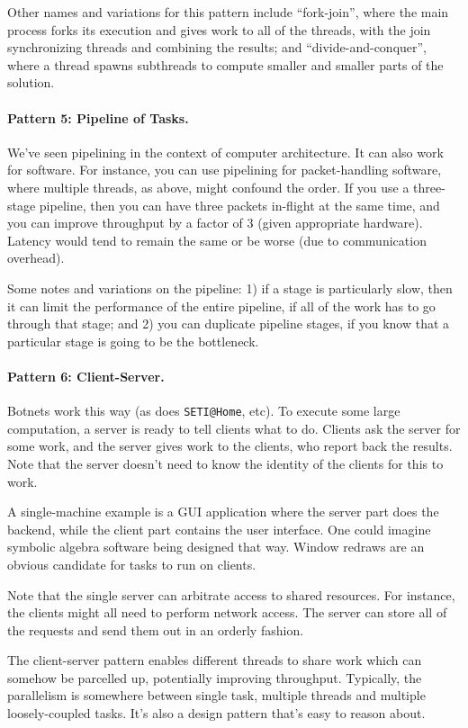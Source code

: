 \documentclass[a4paper]{report}
\begin{document}
Other names and variations for this pattern include ``fork-join'',
where the main process forks its execution and gives work to all of
the threads, with the join synchronizing threads and combining the
results; and ``divide-and-conquer'', where a thread spawns subthreads
to compute smaller and smaller parts of the solution.

\paragraph{Pattern 5: Pipeline of Tasks.} We've seen pipelining in the context of
computer architecture. It can also work for software. For instance,
you can use pipelining for packet-handling software, where multiple
threads, as above, might confound the order. If you use a three-stage
pipeline, then you can have three packets in-flight at the same time,
and you can improve throughput by a factor of 3 (given appropriate
hardware).  Latency would tend to remain the same or be worse (due to
communication overhead).

Some notes and variations on the pipeline: 1) if a stage is
particularly slow, then it can limit the performance of the entire
pipeline, if all of the work has to go through that stage; and 2) you
can duplicate pipeline stages, if you know that a particular stage is
going to be the bottleneck.

\paragraph{Pattern 6: Client-Server.} Botnets work this way (as does \verb+SETI@Home+,
etc). To execute some large computation, a server is ready to tell
clients what to do.  Clients ask the server for some work, and the
server gives work to the clients, who report back the results. Note
that the server doesn't need to know the identity of the clients for
this to work.

A single-machine example is a GUI application where the server part
does the backend, while the client part contains the user interface.
One could imagine symbolic algebra software being designed that way.
Window redraws are an obvious candidate for tasks to run on clients.

Note that the single server can arbitrate access to shared resources.
For instance, the clients might all need to perform network access.
The server can store all of the requests and send them out in an
orderly fashion.

The client-server pattern enables different threads to share work
which can somehow be parcelled up, potentially improving
throughput. Typically, the parallelism is somewhere between single
task, multiple threads and multiple loosely-coupled tasks. It's also a
design pattern that's easy to reason about.
\end{document}

